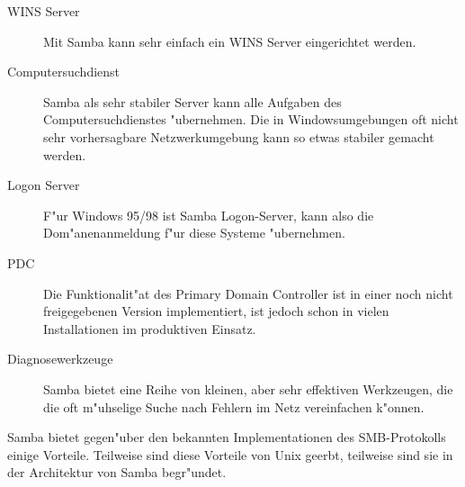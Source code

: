 \documentclass{scrartcl}
\begin{document}
\begin{description}
  
\item[WINS Server] Mit Samba kann sehr einfach ein WINS Server
  eingerichtet werden.
  
\item[Computersuchdienst] Samba als sehr stabiler Server kann alle
  Aufgaben des Computersuchdienstes "ubernehmen. Die in Windowsumgebungen
  oft nicht sehr vorhersagbare Netzwerkumgebung kann so etwas 
  stabiler gemacht werden.
  
\item[Logon Server] F"ur Windows 95/98 ist Samba Logon-Server, kann
  also die Dom"anenanmeldung f"ur diese Systeme "ubernehmen.
  
\item[PDC] Die Funktionalit"at des Primary Domain Controller ist in
  einer noch nicht freigegebenen Version implementiert, ist jedoch
  schon in vielen Installationen im produktiven Einsatz.
  
\item[Diagnosewerkzeuge] Samba bietet eine Reihe von kleinen, aber
sehr effektiven Werkzeugen, die die oft m"uhselige Suche nach Fehlern
im Netz vereinfachen k"onnen.

\end{description}

Samba bietet gegen"uber den bekannten Implementationen des
SMB-Protokolls einige Vorteile. Teilweise sind diese Vorteile von Unix
geerbt, teilweise sind sie in der Architektur von Samba begr"undet.
\end{document}
